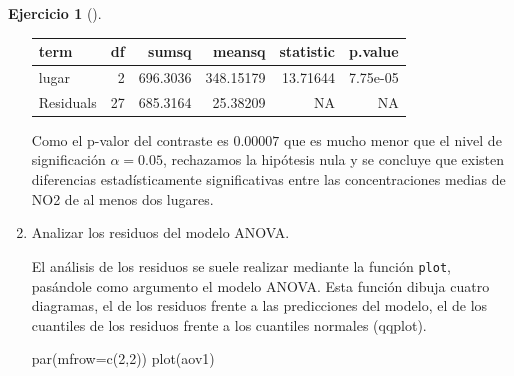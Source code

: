 \documentclass[
  a4paper,
]{scrreport}
\newenvironment{Shaded}{\begin{snugshade}}{\end{snugshade}}
\newcommand{\AttributeTok}[1]{\textcolor[rgb]{0.40,0.45,0.13}{#1}}
\newcommand{\DecValTok}[1]{\textcolor[rgb]{0.68,0.00,0.00}{#1}}
\newcommand{\FunctionTok}[1]{\textcolor[rgb]{0.28,0.35,0.67}{#1}}
\newcommand{\NormalTok}[1]{\textcolor[rgb]{0.00,0.23,0.31}{#1}}
\theoremstyle{definition}
\newtheorem{exercise}{Ejercicio}[chapter]
\theoremstyle{remark}
\begin{document}
\begin{exercise}[]
\begin{enumerate}
\begin{tcolorbox}
  \begin{longtable}[]{@{}lrrrrr@{}}
  \toprule\noalign{}
  term & df & sumsq & meansq & statistic & p.value \\
  \midrule\noalign{}
  \endhead
  \bottomrule\noalign{}
  \endlastfoot
  lugar & 2 & 696.3036 & 348.15179 & 13.71644 & 7.75e-05 \\
  Residuals & 27 & 685.3164 & 25.38209 & NA & NA \\
  \end{longtable}

  Como el p-valor del contraste es \(0.00007\) que es mucho menor que el
  nivel de significación \(\alpha=0.05\), rechazamos la hipótesis nula y
  se concluye que existen diferencias estadísticamente significativas
  entre las concentraciones medias de NO2 de al menos dos lugares.

  \end{tcolorbox}
\item
  Analizar los residuos del modelo ANOVA.

  \begin{tcolorbox}[enhanced jigsaw, colframe=quarto-callout-note-color-frame, toprule=.15mm, bottomtitle=1mm, breakable, opacitybacktitle=0.6, toptitle=1mm, colback=white, bottomrule=.15mm, title=\textcolor{quarto-callout-note-color}{\faInfo}\hspace{0.5em}{Ayuda}, arc=.35mm, left=2mm, titlerule=0mm, rightrule=.15mm, coltitle=black, leftrule=.75mm, opacityback=0, colbacktitle=quarto-callout-note-color!10!white]

  El análisis de los residuos se suele realizar mediante la función
  \texttt{plot}, pasándole como argumento el modelo ANOVA. Esta función
  dibuja cuatro diagramas, el de los residuos frente a las predicciones
  del modelo, el de los cuantiles de los residuos frente a los cuantiles
  normales (qqplot).

  \end{tcolorbox}

  \begin{tcolorbox}[enhanced jigsaw, colframe=quarto-callout-tip-color-frame, toprule=.15mm, bottomtitle=1mm, breakable, opacitybacktitle=0.6, toptitle=1mm, colback=white, bottomrule=.15mm, title=\textcolor{quarto-callout-tip-color}{\faLightbulb}\hspace{0.5em}{Solución}, arc=.35mm, left=2mm, titlerule=0mm, rightrule=.15mm, coltitle=black, leftrule=.75mm, opacityback=0, colbacktitle=quarto-callout-tip-color!10!white]

\begin{Shaded}
\begin{Highlighting}[]
\FunctionTok{par}\NormalTok{(}\AttributeTok{mfrow=}\FunctionTok{c}\NormalTok{(}\DecValTok{2}\NormalTok{,}\DecValTok{2}\NormalTok{))}
\FunctionTok{plot}\NormalTok{(aov1)}
\end{Highlighting}
\end{Shaded}


\end{tcolorbox}
\end{enumerate}
\end{exercise}
\end{document}
